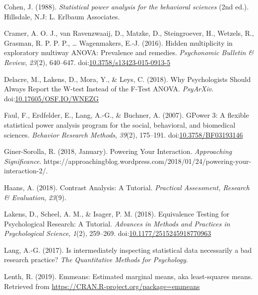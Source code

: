 \documentclass[,man,floatsintext]{apa6}
\begin{document}
\leavevmode\hypertarget{ref-cohen_statistical_1988}{}%
Cohen, J. (1988). \emph{Statistical power analysis for the behavioral sciences} (2nd ed.). Hillsdale, N.J: L. Erlbaum Associates.

\leavevmode\hypertarget{ref-cramer_hidden_2016}{}%
Cramer, A. O. J., van Ravenzwaaij, D., Matzke, D., Steingroever, H., Wetzels, R., Grasman, R. P. P. P., \ldots{} Wagenmakers, E.-J. (2016). Hidden multiplicity in exploratory multiway ANOVA: Prevalence and remedies. \emph{Psychonomic Bulletin \& Review}, \emph{23}(2), 640--647. doi:\href{https://doi.org/10.3758/s13423-015-0913-5}{10.3758/s13423-015-0913-5}

\leavevmode\hypertarget{ref-delacre_why_2018}{}%
Delacre, M., Lakens, D., Mora, Y., \& Leys, C. (2018). Why Psychologists Should Always Report the W-test Instead of the F-Test ANOVA. \emph{PsyArXiv}. doi:\href{https://doi.org/10.17605/OSF.IO/WNEZG}{10.17605/OSF.IO/WNEZG}

\leavevmode\hypertarget{ref-faul_gpower_2007}{}%
Faul, F., Erdfelder, E., Lang, A.-G., \& Buchner, A. (2007). GPower 3: A flexible statistical power analysis program for the social, behavioral, and biomedical sciences. \emph{Behavior Research Methods}, \emph{39}(2), 175--191. doi:\href{https://doi.org/10.3758/BF03193146}{10.3758/BF03193146}

\leavevmode\hypertarget{ref-giner-sorolla_powering_2018}{}%
Giner-Sorolla, R. (2018, January). Powering Your Interaction. \emph{Approaching Significance}. https://approachingblog.wordpress.com/2018/01/24/powering-your-interaction-2/.

\leavevmode\hypertarget{ref-haans_contrast_2018}{}%
Haans, A. (2018). Contrast Analysis: A Tutorial. \emph{Practical Assessment, Research \& Evaluation}, \emph{23}(9).

\leavevmode\hypertarget{ref-lakens_equivalence_2018}{}%
Lakens, D., Scheel, A. M., \& Isager, P. M. (2018). Equivalence Testing for Psychological Research: A Tutorial. \emph{Advances in Methods and Practices in Psychological Science}, \emph{1}(2), 259--269. doi:\href{https://doi.org/10.1177/2515245918770963}{10.1177/2515245918770963}

\leavevmode\hypertarget{ref-lang2017intermediately}{}%
Lang, A.-G. (2017). Is intermediately inspecting statistical data necessarily a bad research practice? \emph{The Quantitative Methods for Psychology}.

\leavevmode\hypertarget{ref-lenthemmeans}{}%
Lenth, R. (2019). Emmeans: Estimated marginal means, aka least-squares means. Retrieved from \url{https://CRAN.R-project.org/package=emmeans}
\end{document}
